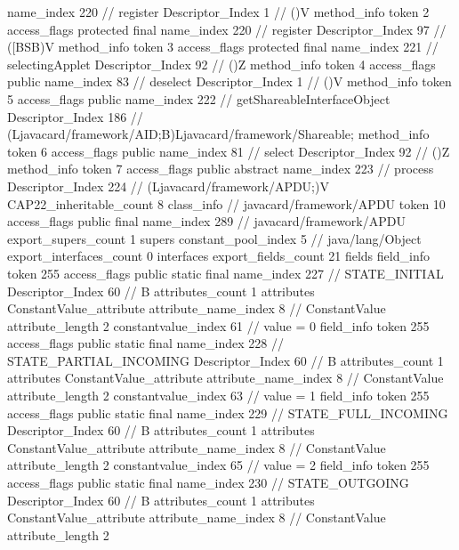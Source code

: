 {{{{{					name_index	220		// register
					Descriptor_Index	1		// ()V
				}
				method_info {
					token	2
					access_flags	protected final
					name_index	220		// register
					Descriptor_Index	97		// ([BSB)V
				}
				method_info {
					token	3
					access_flags	protected final
					name_index	221		// selectingApplet
					Descriptor_Index	92		// ()Z
				}
				method_info {
					token	4
					access_flags	public
					name_index	83		// deselect
					Descriptor_Index	1		// ()V
				}
				method_info {
					token	5
					access_flags	public
					name_index	222		// getShareableInterfaceObject
					Descriptor_Index	186		// (Ljavacard/framework/AID;B)Ljavacard/framework/Shareable;
				}
				method_info {
					token	6
					access_flags	public
					name_index	81		// select
					Descriptor_Index	92		// ()Z
				}
				method_info {
					token	7
					access_flags	public abstract
					name_index	223		// process
					Descriptor_Index	224		// (Ljavacard/framework/APDU;)V
				}
			}
			CAP22_inheritable_count	8
		}
		class_info {		// javacard/framework/APDU
			token	10
			access_flags	public final
			name_index	289		// javacard/framework/APDU
			export_supers_count	1
			supers {
				constant_pool_index	5		// java/lang/Object
			}
			export_interfaces_count	0
			interfaces {
			}
			export_fields_count	21
			fields {
			field_info {
				token	255
				access_flags	public static final
				name_index	227		// STATE_INITIAL
				Descriptor_Index	60		// B
				attributes_count	1
				attributes {
				ConstantValue_attribute {
					attribute_name_index	8		// ConstantValue
					attribute_length	2
					constantvalue_index	61		// value = 0
				}
				}
			}
			field_info {
				token	255
				access_flags	public static final
				name_index	228		// STATE_PARTIAL_INCOMING
				Descriptor_Index	60		// B
				attributes_count	1
				attributes {
				ConstantValue_attribute {
					attribute_name_index	8		// ConstantValue
					attribute_length	2
					constantvalue_index	63		// value = 1
				}
				}
			}
			field_info {
				token	255
				access_flags	public static final
				name_index	229		// STATE_FULL_INCOMING
				Descriptor_Index	60		// B
				attributes_count	1
				attributes {
				ConstantValue_attribute {
					attribute_name_index	8		// ConstantValue
					attribute_length	2
					constantvalue_index	65		// value = 2
				}
				}
			}
			field_info {
				token	255
				access_flags	public static final
				name_index	230		// STATE_OUTGOING
				Descriptor_Index	60		// B
				attributes_count	1
				attributes {
				ConstantValue_attribute {
					attribute_name_index	8		// ConstantValue
					attribute_length	2
}}}}}}}
